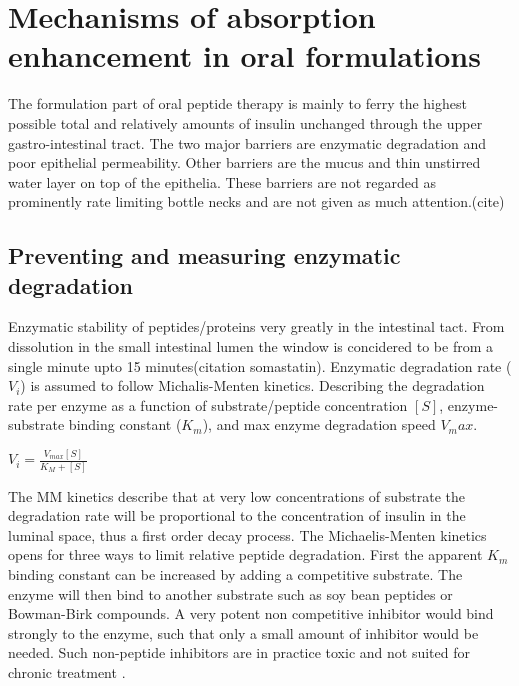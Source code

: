 \section{Mechanisms of absorption enhancement in oral formulations}

The formulation part of oral peptide therapy is mainly to ferry the highest possible total and relatively amounts of insulin unchanged through the upper gastro-intestinal tract. The two major barriers are enzymatic degradation and poor epithelial permeability. Other barriers are the mucus and thin unstirred water layer on top of the epithelia. These barriers are not regarded as prominently rate limiting bottle necks and are not given as much attention.(cite)

\subsection{Preventing and measuring enzymatic degradation}
Enzymatic stability of peptides/proteins very greatly in the intestinal tact. From dissolution in the small intestinal lumen the window is concidered to be from a single minute upto 15 minutes(citation somastatin). Enzymatic degradation rate ($V_i$) is assumed to follow Michalis-Menten kinetics. Describing the degradation rate per enzyme as a function of substrate/peptide concentration $[S]$, enzyme-substrate binding constant ($K_m$), and max enzyme degradation speed $V_max$.

$V_i = \frac{V_{max} [S]}{K_{M}+[S]}$

The MM kinetics describe that at very low concentrations of substrate the degradation rate will be proportional to the concentration of insulin in the luminal space, thus a first order decay process. 
The Michaelis-Menten kinetics opens for three ways to limit relative peptide degradation. First the apparent $K_m$ binding constant can be increased by adding a competitive substrate. The enzyme will then bind to another substrate such as soy bean peptides or Bowman-Birk compounds. A very potent non competitive inhibitor would bind strongly to the enzyme, such that only a small amount of inhibitor would be needed. Such non-peptide inhibitors are in practice toxic and not suited for chronic treatment \cite{bernkop1998use} \cite{murthy1980effect}. 

